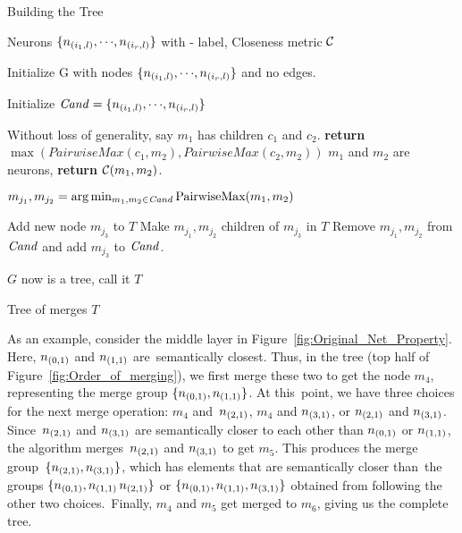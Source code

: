 \begin{algorithm}
\caption{Building the Tree}
\label{a:build-tree}
\begin{algorithmic}[1]

    \Require Neurons $\{n_{(i_1,l)}, {\cdots}, n_{(i_r,l)}\}$ with \inc-\dec
    label, Closeness metric $\mathcal{C}$

    
    \State Initialize G with nodes $\{ n_{(i_1,l)}, {\cdots}, n_{(i_r,l)} \}$
    and no edges. \label{a:build-tree:init}

    \State Initialize $\mathit{Cand}=\{ n_{(i_1,l)}, {\cdots}, n_{(i_r,l)} \}$
    \label{a:build-tree:init-cand}

     \label{a:build-tree:fn-start}
        
            \State Without loss of generality, say $m_1$ has children $c_1$ and
            $c_2$. 
            \State \textbf{return} $\max( PairwiseMax( c_1, m_2 ), PairwiseMax(
            c_2, m_2 ) )$
        \Else
            \State $m_1$ and $m_2$ are neurons, \textbf{return} $\mathcal{C}( m_1, m_2 )$.
        \EndIf

    \EndFunction \label{a:build-tree:fn-end}

     \label{a:build-tree:loop}
    
        \State $m_{j_1}, m_{j_2} = \arg\min_{\substack{m_1, m_2 \in \mathit{Cand}}} 
            \text{PairwiseMax}(m_1, m_2)$ \label{a:build-tree:get-mij}

        \State Add new node $m_{j_3}$ to $T$ \label{a:build-tree:merge-start}
        \State Make $m_{j_1}, m_{j_2}$ children of $m_{j_3}$ in $T$
        \State Remove $m_{j_1}, m_{j_2}$ from $\mathit{Cand}$ and add $m_{j_3}$ to
        $\mathit{Cand}$.
            \label{a:build-tree:merge-end}
    \EndWhile

    \State $G$ now is a tree, call it $T$

    \Ensure Tree of merges $T$
\end{algorithmic}
\end{algorithm}

As an example, consider the middle layer in Figure \ref{fig:Original_Net_Property}. Here, $n_{(0,1)}$ and $n_{(1,1)}$ are semantically closest. Thus, in the tree (top half of Figure \ref{fig:Order_of_merging}), we first merge these two to get the node $m_4$, representing the merge group $\{n_{(0,1)}, n_{(1,1)}\}$. At this point, we have three choices for the next merge operation: $m_4$ and $n_{(2,1)}$, $m_4$ and $n_{(3,1)}$, or $n_{(2,1)}$ and $n_{(3,1)}$. Since $n_{(2,1)}$ and $n_{(3,1)}$ are semantically closer to each other than $n_{(0,1)}$ or $n_{(1,1)}$, the algorithm merges $n_{(2,1)}$ and $n_{(3,1)}$ to get $m_5$. This produces the merge group $\{n_{(2,1)}, n_{(3,1)}\}$, which has elements that are semantically closer than the groups $\{n_{(0,1)}, n_{(1,1)}\, n_{(2,1)}\}$ or $\{n_{(0,1)}, n_{(1,1)},
n_{(3,1)} \}$ obtained from following the other two choices. Finally, $m_4$ and $m_5$ get merged to $m_6$, giving us the complete tree.
 
